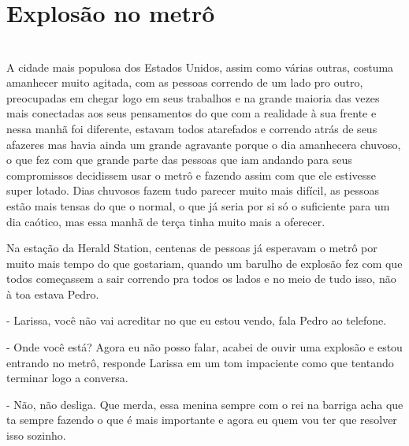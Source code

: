 
    



\newpage


\ifdefined\useChapters
\chapter{Explosão no metrô}

\else
\chapter{}
\fi

A cidade mais populosa dos Estados Unidos, assim como várias outras, costuma amanhecer muito agitada, com as pessoas correndo de um lado pro outro, preocupadas em chegar logo em seus trabalhos e na grande maioria das vezes mais conectadas aos seus pensamentos do que com a realidade à sua frente e nessa manhã foi diferente, estavam todos atarefados e correndo atrás de seus afazeres mas havia ainda um grande agravante porque o dia amanhecera chuvoso, o que fez com que grande parte das pessoas que iam andando para seus compromissos decidissem usar o metrô e fazendo assim com que ele estivesse super lotado. Dias chuvosos fazem tudo parecer muito mais difícil, as pessoas estão mais tensas do que o normal, o que já seria por si só o suficiente para um dia caótico, mas essa manhã de terça tinha muito mais a oferecer.

Na estação da Herald Station, centenas de pessoas já esperavam o metrô por muito mais tempo do que gostariam, quando um barulho de explosão fez com que todos começassem a sair correndo pra todos os lados e no meio de tudo isso, não à toa estava Pedro.

- Larissa, você não vai acreditar no que eu estou vendo, fala Pedro ao telefone.

- Onde você está? Agora eu não posso falar, acabei de ouvir uma explosão e estou entrando no metrô, responde Larissa em um tom impaciente como que tentando terminar logo a conversa.

- Não, não desliga. Que merda, essa menina sempre com o rei na barriga acha que ta sempre fazendo o que é mais importante e agora eu quem vou ter que resolver isso sozinho.


